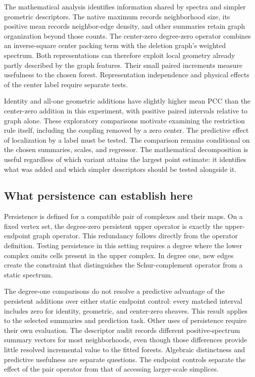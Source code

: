 \documentclass[11pt]{article}
\begin{document}
The mathematical analysis identifies information shared by spectra and simpler geometric descriptors. The native maximum records neighborhood size, its positive mean records neighbor-edge density, and other summaries retain graph organization beyond those counts. The center-zero degree-zero operator combines an inverse-square center packing term with the deletion graph's weighted spectrum. Both representations can therefore exploit local geometry already partly described by the graph features. Their small paired increments measure usefulness to the chosen forest. Representation independence and physical effects of the center label require separate tests.

Identity and all-one geometric additions have slightly higher mean PCC than the center-zero addition in this experiment, with positive paired intervals relative to graph alone. These exploratory comparisons motivate examining the restriction rule itself, including the coupling removed by a zero center. The predictive effect of localization by a label must be tested. The comparison remains conditional on the chosen summaries, scales, and regressor. The mathematical decomposition is useful regardless of which variant attains the largest point estimate: it identifies what was added and which simpler descriptors should be tested alongside it.

\subsection{What persistence can establish here}
Persistence is defined for a compatible pair of complexes and their maps. On a fixed vertex set, the degree-zero persistent upper operator is exactly the upper-endpoint graph operator. This redundancy follows directly from the operator definition. Testing persistence in this setting requires a degree where the lower complex omits cells present in the upper complex. In degree one, new edges create the constraint that distinguishes the Schur-complement operator from a static spectrum.

The degree-one comparisons do not resolve a predictive advantage of the persistent additions over either static endpoint control: every matched interval includes zero for identity, geometric, and center-zero sheaves. This result applies to the selected summaries and prediction task. Other uses of persistence require their own evaluation. The descriptor audit records different positive-spectrum summary vectors for most neighborhoods, even though those differences provide little resolved incremental value to the fitted forests. Algebraic distinctness and predictive usefulness are separate questions. The endpoint controls separate the effect of the pair operator from that of accessing larger-scale simplices.
\end{document}
